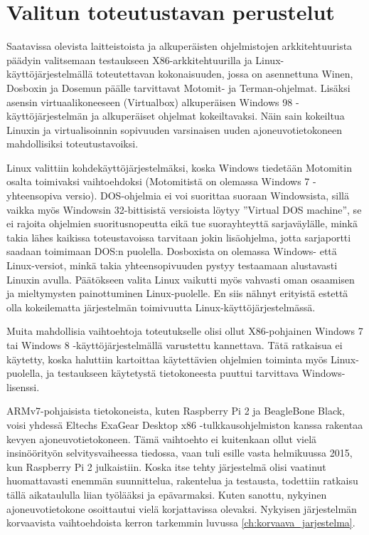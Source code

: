 \section{Valitun toteutustavan perustelut}

Saatavissa olevista laitteistoista ja alkuperäisten ohjelmistojen arkkitehtuurista päädyin valitsemaan testaukseen X86-arkkitehtuurilla ja Linux-käyttöjärjestelmällä toteutettavan kokonaisuuden, jossa on asennettuna Winen, Dosboxin ja Dosemun päälle tarvittavat Motomit- ja Terman-ohjelmat. Lisäksi asensin virtuaalikoneeseen (Virtualbox) alkuperäisen Windows 98 -käyttöjärjestelmän ja alkuperäiset ohjelmat kokeiltavaksi. Näin sain kokeiltua Linuxin ja virtualisoinnin sopivuuden varsinaisen uuden ajoneuvotietokoneen mahdollisiksi toteutustavoiksi.

Linux valittiin kohdekäyttöjärjestelmäksi, koska Windows tiedetään Motomitin osalta toimivaksi vaihtoehdoksi (Motomitistä on olemassa Windows 7 -yhteensopiva versio). DOS-ohjelmia ei voi suorittaa suoraan Windowsista, sillä vaikka myös Windowsin 32-bittisistä versioista löytyy ''Virtual DOS machine'',  se ei rajoita ohjelmien suoritusnopeutta eikä tue suorayhteyttä sarjaväylälle, minkä takia lähes kaikissa toteustavoissa tarvitaan jokin lisäohjelma, jotta sarjaportti saadaan toimimaan DOS:n puolella. Dosboxista on olemassa Windows- että Linux-versiot, minkä takia yhteensopivuuden pystyy testaamaan alustavasti Linuxin avulla. Päätökseen valita Linux vaikutti myös vahvasti oman osaamisen ja mieltymysten painottuminen Linux-puolelle. En siis nähnyt erityistä estettä olla kokeilematta järjestelmän toimivuutta Linux-käyttöjärjestelmässä.

Muita mahdollisia vaihtoehtoja toteutukselle olisi ollut X86-pohjainen Windows 7 tai Windows 8 -käyttöjärjestelmällä varustettu kannettava. Tätä ratkaisua ei käytetty, koska haluttiin kartoittaa käytettävien ohjelmien toiminta myös Linux-puolella, ja testaukseen käytetystä tietokoneesta puuttui tarvittava Windows-lisenssi.

ARMv7-pohjaisista tietokoneista, kuten Raspberry Pi 2 ja BeagleBone Black, voisi yhdessä Eltechs ExaGear Desktop x86 -tulkkausohjelmiston kanssa rakentaa kevyen ajoneuvotietokoneen. Tämä vaihtoehto ei kuitenkaan ollut vielä insinöörityön selvitysvaiheessa tiedossa, vaan tuli esille vasta helmikuussa 2015, kun Raspberry Pi 2 julkaistiin. Koska itse tehty järjestelmä olisi vaatinut huomattavasti enemmän suunnittelua, rakentelua ja testausta, todettiin ratkaisu tällä aikataululla liian työlääksi ja epävarmaksi. Kuten sanottu, nykyinen ajoneuvotietokone osoittautui vielä korjattavissa olevaksi. Nykyisen järjestelmän korvaavista vaihtoehdoista kerron tarkemmin luvussa \ref{ch:korvaava_jarjestelma}.

